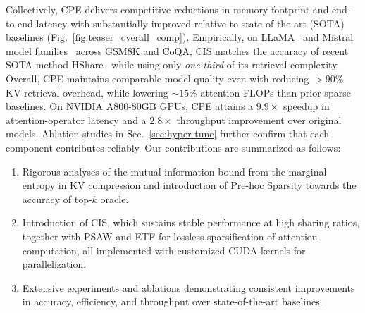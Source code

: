 Collectively, CPE delivers competitive reductions in memory footprint and end-to-end latency with substantially improved relative to state-of-the-art (SOTA) baselines (Fig.~\ref{fig:teaser_overall_comp}). Empirically, on LLaMA~\cite{touvron2023llama} and Mistral model families~\cite{jiang2023mistral7b} across GSM8K and CoQA, CIS matches the accuracy of recent SOTA method HShare~\cite{wuhshare} while using only \emph{one-third} of its retrieval complexity. Overall, CPE maintains comparable model quality even with reducing $> \!90\%$ KV-retrieval overhead, while lowering $\sim \! 15\%$ attention FLOPs than prior sparse baselines. On NVIDIA A800-80GB GPUs, CPE attains a $\mathbf{9.9\!\times}$ speedup in attention-operator latency and a $\mathbf{2.8\!\times}$ throughput improvement over original models. Ablation studies in Sec.~\ref{sec:hyper-tune} further confirm that each component contributes reliably. Our contributions are summarized as follows:
\begin{enumerate}[label=\arabic*)]
    \item Rigorous analyses of the mutual information bound from the marginal entropy in KV compression and introduction of Pre-hoc Sparsity towards the accuracy of top-$k$ oracle.
    \item Introduction of CIS, which sustains stable performance at high sharing ratios, together with PSAW and ETF for lossless sparsification of attention computation, all implemented with customized CUDA kernels for parallelization.
    \item Extensive experiments and ablations demonstrating consistent improvements in accuracy, efficiency, and throughput over state-of-the-art baselines.
\end{enumerate}



